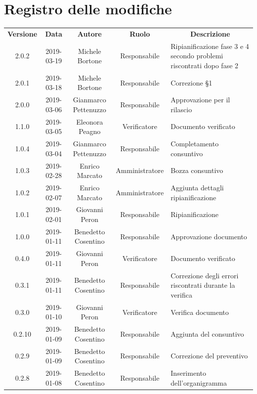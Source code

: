 \documentclass[11pt,a4paper]{article}
\begin{document}
	
	{\def\arraystretch{2}\tabcolsep=10pt
	\newpage
	\section*{\centering Registro delle modifiche}
	\begin{tabularx}{\textwidth}{ c | c | c | c | X }
		\rowcolor{LightBlue}
		\color{white}\bfseries Versione & 
		\color{white}\bfseries Data & 
		\color{white}\bfseries Autore & 
		\color{white}\bfseries Ruolo & 
		\multicolumn{1}{c}{\color{white}\bfseries Descrizione}\\[0.25cm]
		2.0.2 & 2019-03-19 & Michele Bortone & Responsabile & Ripianificazione fase 3 e 4 secondo problemi riscontrati dopo fase 2\\ \hline
		2.0.1 & 2019-03-18 & Michele Bortone & Responsabile & Correzione §1\\ \hline
		2.0.0 & 2019-03-06 & Gianmarco Pettenuzzo & Responsabile & Approvazione per il rilascio\\ \hline
		1.1.0 & 2019-03-05 & Eleonora Peagno & Verificatore & Documento verificato\\ \hline
		1.0.4 & 2019-03-04 & Gianmarco Pettenuzzo & Responsabile & Completamento consuntivo\\ \hline
		1.0.3 & 2019-02-28 & Enrico Marcato & Amministratore & Bozza consuntivo\\ \hline
		1.0.2 & 2019-02-07 & Enrico Marcato & Amministratore & Aggiunta dettagli ripianificazione\\ \hline
		1.0.1 & 2019-02-01 & Giovanni Peron & Responsabile & Ripianificazione\\ \hline
		1.0.0 & 2019-01-11 & Benedetto Cosentino & Responsabile & Approvazione documento\\ \hline
		0.4.0 & 2019-01-11 & Giovanni Peron & Verificatore & Documento verificato\\ \hline
		0.3.1 & 2019-01-11 & Benedetto Cosentino & Responsabile & Correzione degli errori riscontrati durante la verifica \\ \hline
		0.3.0 & 2019-01-10 & Giovanni Peron & Verificatore & Verifica documento\\ \hline
		0.2.10 & 2019-01-09 & Benedetto Cosentino & Responsabile & Aggiunta del consuntivo\\ \hline
		0.2.9 & 2019-01-09 & Benedetto Cosentino & Responsabile & Correzione del preventivo\\ \hline
		0.2.8 & 2019-01-08 & Benedetto Cosentino & Responsabile & Inserimento dell'organigramma \\ \hline

\end{tabularx}}
\end{document}
